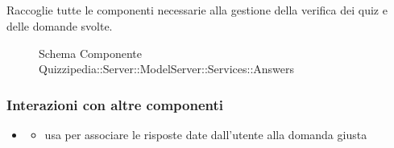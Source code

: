 \subsection{}
Raccoglie tutte le componenti necessarie alla gestione della verifica dei quiz e delle domande svolte.
\begin{figure}[H]
\centering
\noindent{}
\caption[Schema Componente Quizzipedia::Server::ModelServer::Services::Answers]{Schema Componente Quizzipedia::Server::ModelServer::Services::Answers}
\end{figure}
\subsubsection{Interazioni con altre componenti}
\begin{itemize}
\item {}
\begin{itemize}
\item usa  per associare le risposte date dall'utente alla domanda giusta
\end{itemize}
\end{itemize}
